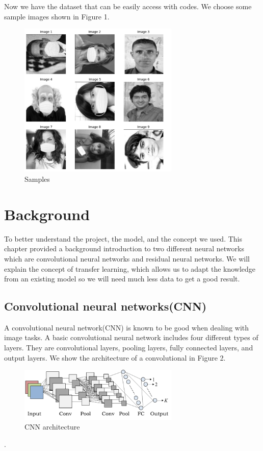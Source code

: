 \documentclass{article}
\begin{document}
Now we have the dataset that can be easily access with codes. We choose some sample images shown in Figure 1.
\begin{figure}[H]
 \centering
    \includegraphics[width=3.0in]{figs/samples}
    \caption{Samples}
    \label{Samples}
\end{figure}


\section{Background}
\label{headings}

 To better understand the project, the model, and the concept we used. This chapter provided a background introduction to two different neural networks which are convolutional neural networks and residual neural networks. We will explain the concept of transfer learning, which allows us to adapt the knowledge from an existing model so we will need much less data to get a good result.
\subsection{Convolutional neural networks(CNN)}
  A convolutional neural network(CNN)\cite{albawi2017understanding} is known to be good when dealing with image tasks. A basic convolutional neural network includes four different types of layers. They are convolutional layers, pooling layers, fully connected layers, and output layers. We show the architecture of a convolutional in Figure 2.

\begin{figure}[H]
 \centering
    \includegraphics[width=3.0in]{figs/cnnArch}
    \caption{CNN architecture}
\end{figure}.
\end{document}

